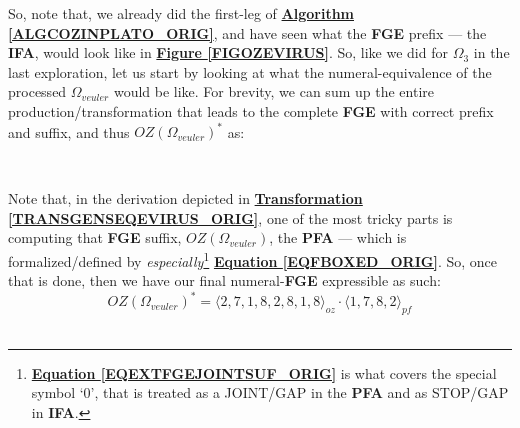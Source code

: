 \documentclass[a4paper, 18pt]{book} %
\newtheorem{trans}{Transformation}
\begin{document}
\begin{appendices}
So, note that, we already did the first-leg of \textbf{\hyperref[ALGCOZINPLATO_ORIG]{Algorithm \ref{ALGCOZINPLATO_ORIG}}}, and have seen what the \textbf{FGE} prefix --- the \textbf{IFA}, would look like in \textbf{\hyperref[FIGOZEVIRUS]{Figure \ref{FIGOZEVIRUS}}}. So, like we did for $\Omega_{3}$ in the last exploration, let us start by looking at what the numeral-equivalence of the processed $\Omega_{veuler}$ would be like. For brevity, we can sum up the entire production/transformation that leads to the complete \textbf{FGE} with correct prefix and suffix, and thus $\boxed{OZ(\Omega_{veuler})}^*$ as:

\begin{center}
\\
\end{center}


Note that, in the derivation depicted in \textbf{\hyperref[TRANSGENSEQEVIRUS_ORIG]{Transformation \ref{TRANSGENSEQEVIRUS_ORIG}}}, one of the most tricky parts is computing that \textbf{FGE} suffix, $\boxed{OZ(\Omega_{veuler})}$, the \textbf{PFA} --- which is formalized/defined by \textit{especially}\footnote{\textbf{\hyperref[EQEXTFGEJOINTSUF_ORIG]{Equation \ref{EQEXTFGEJOINTSUF_ORIG}}} is what covers the special symbol `0', that is treated as a JOINT/GAP in the \textbf{PFA} and as STOP/GAP in \textbf{IFA}.} \textbf{\hyperref[EQFBOXED_ORIG]{Equation \ref{EQFBOXED_ORIG}}}. So, once that is done, then we have our final numeral-\textbf{FGE} expressible as such:\\

\begin{equation}
\label{EQGFEEVIRUS_ORIG}
\boxed{OZ(\Omega_{veuler})}^* =  \langle 2,7,1,8,2,8,1,8 \rangle_{oz}\cdot\boxed{\langle 1, 7, 8, 2 \rangle}_{pf}
\end{equation}\\


\end{appendices}
\end{document}
